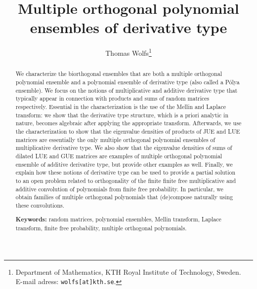 \documentclass[a4paper,12pt,oneside]{article}
\title{Multiple orthogonal polynomial ensembles of derivative type}
\author{Thomas Wolfs\footnote{Department of Mathematics, KTH Royal Institute of Technology, Sweden. \\
E-mail adress: \texttt{wolfs[at]kth.se}.}}
\date{}
\theoremstyle{definition}
\begin{document}
\maketitle

\begin{abstract}

We characterize the biorthogonal ensembles that are both a multiple orthogonal polynomial ensemble and a polynomial ensemble of derivative type (also called a Pólya ensemble). We focus on the notions of multiplicative and additive derivative type that typically appear in connection with products and sums of random matrices respectively. Essential in the characterization is the use of the Mellin and Laplace transform: we show that the derivative type structure, which is a priori analytic in nature, becomes algebraic after applying the appropriate transform. Afterwards, we use the characterization to show that the eigenvalue densities of products of JUE and LUE matrices are essentially the only multiple orthogonal polynomial ensembles of multiplicative derivative type. We also show that the eigenvalue densities of sums of dilated LUE and GUE matrices are examples of multiple orthogonal polynomial ensemble of additive derivative type, but provide other examples as well. Finally, we explain how these notions of derivative type can be used to provide a partial solution to an open problem related to orthogonality of the finite finite free multiplicative and additive convolution of polynomials from finite free probability. In particular, we obtain families of multiple orthogonal polynomials that (de)compose naturally using these convolutions.
\medbreak

\textbf{Keywords:} random matrices, polynomial ensembles, Mellin transform, Laplace transform, finite free probability, multiple orthogonal polynomials.

\end{abstract}

\end{document}
